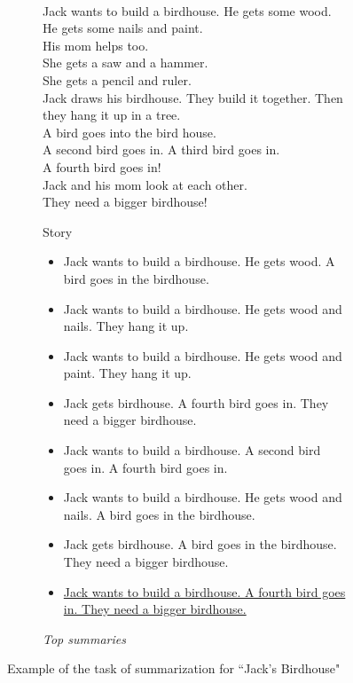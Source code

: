 \begin{figure}[H]\
\begin{subfigure}{\textwidth}
\begin{displayquote}
Jack wants to build a birdhouse. He gets some wood.\\
He gets some nails and paint.\\
His mom helps too.\\
She gets a saw and a hammer.\\
She gets a pencil and ruler.\\
Jack draws his birdhouse. They build it together. Then they hang it up in a tree.\\
A bird goes into the bird house.\\
A second bird goes in. A third bird goes in.\\
A fourth bird goes in!\\
Jack and his mom look at each other.\\
They need a bigger birdhouse!
\end{displayquote}
\caption{Story}
\vspace{\baselineskip}
\end{subfigure}
\begin{subfigure}{\textwidth}
\begin{itemize}[nolistsep]
\item Jack wants to build a birdhouse. He gets wood. A bird goes in the birdhouse.
\item Jack wants to build a birdhouse. He gets wood and nails. They hang it up.
\item Jack wants to build a birdhouse. He gets wood and paint. They hang it up.
\item Jack gets birdhouse. A fourth bird goes in. They need a bigger birdhouse.
\item Jack wants to build a birdhouse. A second bird goes in. A fourth bird goes in.
\item Jack wants to build a birdhouse. He gets wood and nails. A bird goes in the birdhouse.
\item Jack gets birdhouse. A bird goes in the birdhouse. They need a bigger birdhouse.
\item \ul{Jack wants to build a birdhouse. A fourth bird goes in. They need a bigger birdhouse.}
\end{itemize}
\vspace{\topsep}
\caption{\textit{Top summaries}}
\end{subfigure}
\caption{Example of the task of summarization for ``Jack's Birdhouse"}
\label{fig:jacks_birdhouse}
\end{figure}